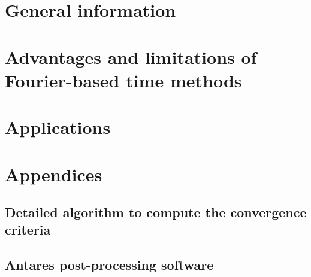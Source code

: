 \documentclass[a4paper, twoside, 11pt, openright]{book}
\begin{document}
\frontmatter

 

\cleardoublepage




\tableofcontents





\mainmatter

\part{General information}
\label{part1}




\part{Advantages and limitations of Fourier-based time methods}
\label{part2}




\part{Applications}
\label{part3}







\appendix

\part*{Appendices}

\chapter{Detailed algorithm to compute the convergence criteria}


\chapter{Antares post-processing software}

\end{document}
